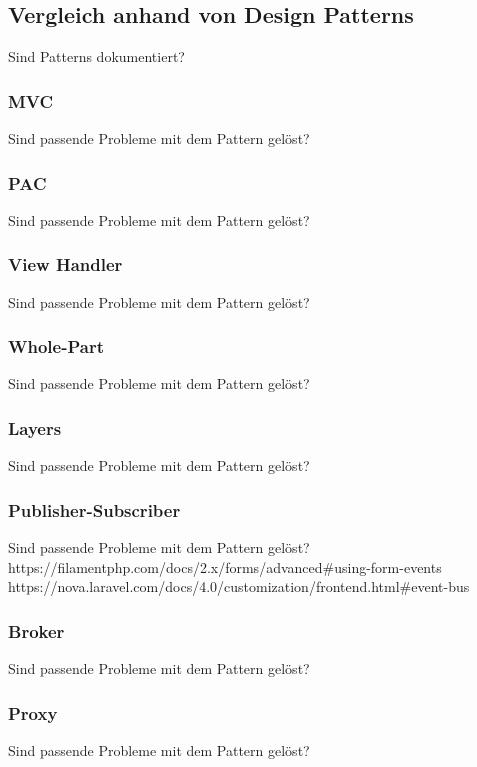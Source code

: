 \color{red}

\subsection{Vergleich anhand von Design Patterns}
Sind Patterns dokumentiert?

\subsubsection{MVC}
Sind passende Probleme mit dem Pattern gelöst?

\subsubsection{PAC}
Sind passende Probleme mit dem Pattern gelöst?

\subsubsection{View Handler}
Sind passende Probleme mit dem Pattern gelöst?

\subsubsection{Whole-Part}
Sind passende Probleme mit dem Pattern gelöst?

\subsubsection{Layers}
Sind passende Probleme mit dem Pattern gelöst?

\subsubsection{Publisher-Subscriber}
Sind passende Probleme mit dem Pattern gelöst?
https://filamentphp.com/docs/2.x/forms/advanced#using-form-events
https://nova.laravel.com/docs/4.0/customization/frontend.html#event-bus

\subsubsection{Broker}
Sind passende Probleme mit dem Pattern gelöst?

\subsubsection{Proxy}
Sind passende Probleme mit dem Pattern gelöst?

